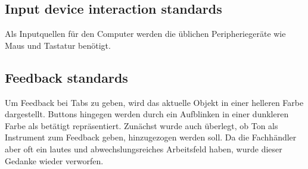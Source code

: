 \subsection{Input device interaction standards}
Als Inputquellen für den Computer werden die üblichen Peripheriegeräte wie Maus und Tastatur benötigt. 

\subsection{Feedback standards} 
Um Feedback bei Tabs zu geben, wird das aktuelle Objekt in einer helleren Farbe dargestellt. Buttons hingegen werden durch ein Aufblinken in einer dunkleren Farbe als betätigt repräsentiert. Zunächst wurde auch überlegt, ob Ton als Instrument zum Feedback geben, hinzugezogen werden soll. Da die Fachhändler aber oft ein lautes und abwechslungsreiches Arbeitsfeld haben, wurde dieser Gedanke wieder verworfen. 

